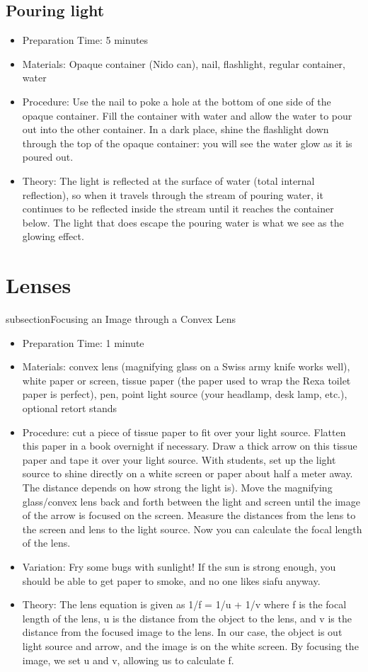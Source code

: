 \subsection{Pouring light}
\begin{itemize}
\item{Preparation Time: 5 minutes}
\item{Materials: Opaque container (Nido can), nail, flashlight, regular container, water}
\item{Procedure: Use the nail to poke a hole at the bottom of one side of the opaque container. Fill the container with water and allow the water to pour out into the other container. In a dark place, shine the flashlight down through the top of the opaque container: you will see the water glow as it is poured out.}
\item{Theory: The light is reflected at the surface of water (total internal reflection), so when it travels through the stream of pouring water, it continues to be reflected inside the stream until it reaches the container below. The light that does escape the pouring water is what we see as the glowing effect.}
\end{itemize}

\section{Lenses}
subsection{Focusing an Image through a Convex Lens}
\begin{itemize}
\item{Preparation Time: 1 minute}
\item{Materials: convex lens (magnifying glass on a Swiss army knife works well), white paper or screen, tissue paper (the paper used to wrap the Rexa toilet paper is perfect), pen, point light source (your headlamp, desk lamp, etc.), optional retort stands}
\item{Procedure: cut a piece of tissue paper to fit over your light source. Flatten this paper in a book overnight if necessary. Draw a thick arrow on this tissue paper and tape it over your light source. With students, set up the light source to shine directly on a white screen or paper about half a meter away. The distance depends on how strong the light is). Move the magnifying glass/convex lens back and forth between the light and screen until the image of the arrow is focused on the screen. Measure the distances from the lens to the screen and lens to the light source. Now you can calculate the focal length of the lens.}
\item{Variation: Fry some bugs with sunlight! If the sun is strong enough, you should be able to get paper to smoke, and no one likes siafu anyway.}
\item{Theory: The lens equation is given as 1/f = 1/u + 1/v where f is the focal length of the lens, u is the distance from the object to the lens, and v is the distance from the focused image to the lens. In our case, the object is out light source and arrow, and the image is on the white screen. By focusing the image, we set u and v, allowing us to calculate f.}
\end{itemize}

